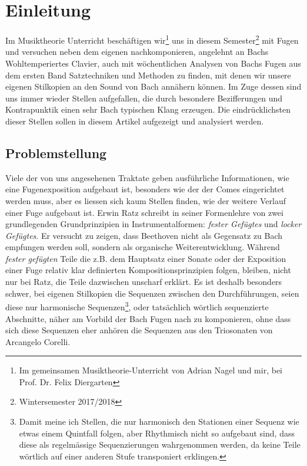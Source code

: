 \section{Einleitung}

Im Musiktheorie Unterricht beschäftigen wir\footnote{Im gemeinsamen Musiktheorie-Unterricht von Adrian Nagel und mir, bei Prof. Dr. Felix Diergarten} uns in diesem Semester\footnote{Wintersemester 2017/2018} mit Fugen und versuchen neben dem eigenen nachkomponieren, angelehnt an Bachs Wohltemperiertes Clavier, auch mit wöchentlichen Analysen von Bachs Fugen aus dem ersten Band Satztechniken und Methoden zu finden, mit denen wir unsere eigenen Stilkopien an den Sound von Bach annähern können.
Im Zuge dessen sind uns immer wieder Stellen aufgefallen, die durch besondere Bezifferungen und Kontrapunktik einen sehr Bach typischen Klang erzeugen.
Die eindrücklichsten dieser Stellen sollen in diesem Artikel aufgezeigt und analysiert werden.


\subsection{Problemstellung}

Viele der von uns angesehenen Traktate geben ausführliche Informationen, wie eine Fugenexposition aufgebaut ist, besonders wie der der Comes eingerichtet werden muss, aber es liessen sich kaum Stellen finden, wie der weitere Verlauf einer Fuge aufgebaut ist.
Erwin Ratz schreibt in seiner Formenlehre\autocite[21]{ratz:formenlehre} von zwei grundlegenden Grundprinzipien in Instrumentalformen: \emph{fester Gefügtes} und \emph{locker Gefügtes}.
Er versucht zu zeigen, dass Beethoven nicht als Gegensatz zu Bach empfungen werden soll, sondern als organische Weiterentwicklung.
Während \emph{fester gefügten} Teile die z.B. dem Hauptsatz einer Sonate oder der Exposition einer Fuge relativ klar definierten Kompositionsprinzipien folgen, bleiben, nicht nur bei Ratz, die Teile dazwischen unscharf erklärt.
Es ist deshalb besonders schwer, bei eigenen Stilkopien die Sequenzen zwischen den Durchführungen, seien diese nur harmonische Sequenzen\footnote{Damit meine ich Stellen, die nur harmonisch den Stationen einer Sequenz wie etwas einem Quintfall folgen, aber Rhythmisch nicht so aufgebaut sind, dass diese als regelmässige Sequenzierungen wahrgenommen werden, da keine Teile wörtlich auf einer anderen Stufe transponiert erklingen.}, oder tatsächlich wörtlich sequenzierte Abschnitte, näher am Vorbild der Bach Fugen nach zu komponieren, ohne dass sich diese Sequenzen eher anhören die Sequenzen aus den Triosonaten von Arcangelo Corelli.


